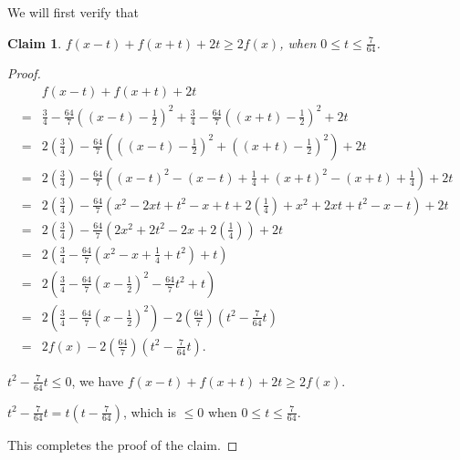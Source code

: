 \documentclass[12pt]{ucthesis}
\theoremstyle{plain}
\newtheorem{claim}{Claim}
\theoremstyle{definition}
\begin{document}
We will first verify that
\begin{claim}
\label{Claim 5}
$f(x - t) + f(x + t) + 2 t \ge 2 f(x)$, when $0 \le t \le \frac{7}{64}$.
\end{claim}
\begin{proof}
\begin{align*}
  & f(x - t) + f(x + t) + 2 t \\
= & \frac{3}{4} - \frac{64}{7} ((x - t) - \frac{1}{2})^2 +
    \frac{3}{4} - \frac{64}{7} ((x + t) - \frac{1}{2})^2 + 2 t \\
= & 2 (\frac{3}{4}) - \frac{64}{7} \left(((x - t) - \frac{1}{2})^2 +
    ((x + t) - \frac{1}{2})^2\right) + 2 t \\
= & 2 (\frac{3}{4}) - \frac{64}{7} \left((x - t)^2 - (x - t) + \frac{1}{4} +
    (x + t)^2 - (x + t) + \frac{1}{4}\right) + 2 t \\
= & 2 (\frac{3}{4}) - \frac{64}{7} (x^2 - 2 x t + t^2 - x + t + 2 (\frac{1}{4}) +
    x^2 + 2 x t + t^2 - x - t) + 2 t \\
= & 2 (\frac{3}{4}) - \frac{64}{7} (2 x^2 + 2 t^2 - 2 x + 2 (\frac{1}{4})) + 2 t \\
= & 2 (\frac{3}{4} - \frac{64}{7} (x^2 - x + \frac{1}{4} + t^2) + t) \\
= & 2 (\frac{3}{4} - \frac{64}{7} (x - \frac{1}{2})^2 - \frac{64}{7} t^2 + t) \\
= & 2 (\frac{3}{4} - \frac{64}{7} (x - \frac{1}{2})^2) - 2 (\frac{64}{7}) (t^2 - \frac{7}{64} t) \\
= & 2 f(x) - 2 (\frac{64}{7}) (t^2 - \frac{7}{64} t).
\end{align*}

$t^2 - \frac{7}{64} t \le 0$, we have $f(x - t) + f(x + t) + 2 t \ge 2 f(x)$.

$t^2 - \frac{7}{64} t = t (t - \frac{7}{64})$, which is $\le 0$ when $0 \le t \le \frac{7}{64}$.

This completes the proof of the claim.
\end{proof}
\end{document}

